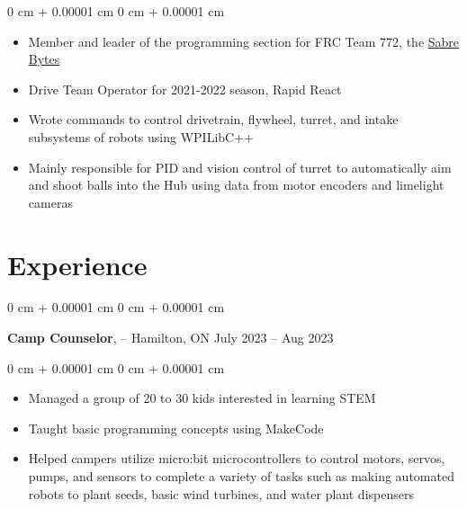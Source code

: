 \documentclass[10pt, letterpaper]{article}
\newenvironment{highlights}{
    \begin{itemize}[
        topsep=0.10 cm,
        parsep=0.10 cm,
        partopsep=0pt,
        itemsep=0pt,
        leftmargin=0 cm + 10pt
    ]
}{
    \end{itemize}
} %
\newenvironment{onecolentry}{
    \begin{adjustwidth}{
        0 cm + 0.00001 cm
    }{
        0 cm + 0.00001 cm
    }
}{
    \end{adjustwidth}
} %
\newenvironment{twocolentry}[2][]{
    \onecolentry
    \def\secondColumn{#2}
    \setcolumnwidth{\fill, 4.5 cm}
    \begin{paracol}{2}
}{
    \switchcolumn \raggedleft \secondColumn
    \end{paracol}
    \endonecolentry
} %
\newcommand{\customref}[3][primaryColor]{\href{#2}{\color{#1}{\underline{#3}}}}
\begin{document}
        \vspace{0.10 cm}
        \begin{onecolentry}
            \begin{highlights}
                \item Member and leader of the programming section for FRC Team 772, the \href{https://www.sabrerobotics.com/}{Sabre Bytes}
                \item Drive Team Operator for 2021-2022 season, Rapid React
                \item Wrote commands to control drivetrain, flywheel, turret, and intake subsystems of robots using WPILibC++
                \item Mainly responsible for PID and vision control of turret to automatically aim and shoot balls into the Hub using data from motor encoders and limelight cameras
            \end{highlights}
        \end{onecolentry}



    
    \section{Experience}



        
        \begin{twocolentry}{
            July 2023 – Aug 2023
        }
            \textbf{Camp Counselor}, \textbf{\customref{https://stemcamp.ca/}{STEM Camp}} -- Hamilton, ON\end{twocolentry}

        \vspace{0.10 cm}
        \begin{onecolentry}
            \begin{highlights}
                \item Managed a group of 20 to 30 kids interested in learning STEM
                \item Taught basic programming concepts using MakeCode
                \item Helped campers utilize micro:bit microcontrollers to control motors, servos, pumps, and sensors to complete a variety of tasks such as making automated robots to plant seeds, basic wind turbines, and water plant dispensers
            \end{highlights}
        \end{onecolentry}
\end{document}
